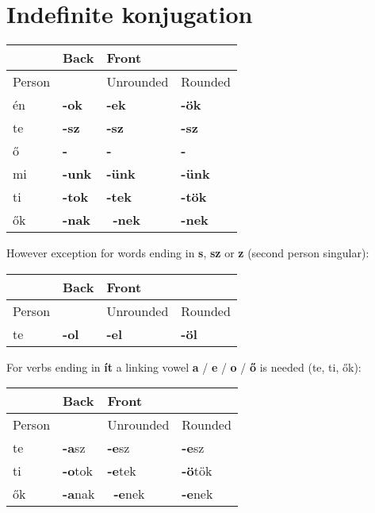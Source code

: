 \documentclass{article}
\begin{document}
\section{Indefinite konjugation}
\begin{tabularx} {\textwidth}{ X X X X } \toprule
	 & Back  & Front & \\ \midrule 
	 Person & & Unrounded & Rounded \\ \midrule
	 én & \textbf{-ok} & \textbf{-ek} & \textbf{-ök} \\
	 te & \textbf{-sz} & \textbf{-sz} & \textbf{-sz} \\
	 ő & \textbf{-} & \textbf{-} & \textbf{-} \\
	 mi & \textbf{-unk} & \textbf{-ünk} & \textbf{-ünk} \\
	 ti & \textbf{-tok} & \textbf{-tek} & \textbf{-tök} \\
	 ők & \textbf{-nak} & \textbf{-nek} & \textbf{-nek} \\ \bottomrule
\end{tabularx}
However exception for words ending in \textbf{s}, \textbf{sz} or \textbf{z} (second person singular):
\begin{tabularx} {\textwidth}{ X X X X } \toprule
	 & Back  & Front & \\ \midrule 
	 Person & & Unrounded & Rounded \\ \midrule
	 te & \textbf{-ol} & \textbf{-el} & \textbf{-öl} \\ \bottomrule
\end{tabularx}
For verbs ending in \textbf{ít} a linking vowel \textbf{a} / \textbf{e} / \textbf{o} / \textbf{ő} is needed (te, ti, ők):
\begin{tabularx} {\textwidth}{ X X X X } \toprule
	 & Back  & Front & \\ \midrule 
	 Person & & Unrounded & Rounded \\ \midrule
	 te & \textbf{-a}sz & \textbf{-e}sz & \textbf{-e}sz \\
	 ti & \textbf{-o}tok & \textbf{-e}tek & \textbf{-ö}tök \\
	 ők & \textbf{-a}nak & \textbf{-e}nek & \textbf{-e}nek \\ \bottomrule
\end{tabularx}
\end{document}
